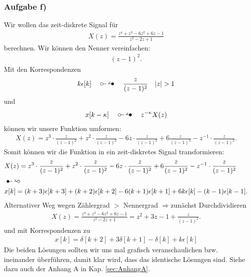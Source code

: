 \documentclass[11pt,a4paper,DIV=12]{scrartcl}
\begin{document}
\subsubsection{Aufgabe f)}
Wir wollen das zeit-diskrete Signal für
\begin{align}
	X(z)=\frac{z^4+z^3-6z^2+6z-1}{z^2-2z+1}
\end{align}
berechnen.
Wir können den Nenner vereinfachen:
\begin{align}
	(z-1)^2.
\end{align}
Mit den Korrespondenzen
\begin{align}
	k\epsilon[k]\quad\ztransf\quad\frac{z}{(z-1)^2}\quad |z|>1
\end{align}
und
\begin{align}
	x[k-\kappa]\quad\ztransf\quad z^{-\kappa}X(z)
\end{align}
können wir unsere Funktion umformen:
\begin{align}
	X(z)=z^3\cdot\frac{z}{(z-1)^2}+z^2\cdot\frac{z}{(z-1)^2}-6z\cdot\frac{z}{(z-1)^2}+6\frac{z}{(z-1)^2}-z^{-1}\cdot\frac{z}{(z-1)^2}.
\end{align}
Somit können wir die Funktion in ein zeit-diskretes Signal transformieren:
\begin{align}
	&X(z)=z^3\cdot\frac{z}{(z-1)^2}+z^2\cdot\frac{z}{(z-1)^2}-6z\cdot\frac{z}{(z-1)^2}+6\frac{z}{(z-1)^2}-z^{-1}\cdot\frac{z}{(z-1)^2} \nonumber\\
	&\Ztransf \nonumber\\
	&x[k]=(k+3)\epsilon[k+3]+(k+2)\epsilon[k+2]-6(k+1)\epsilon[k+1]+6k\epsilon[k]-(k-1)\epsilon[k-1].
\end{align}
%
%
Alternativer Weg wegen Zählergrad $>$ Nennergrad \quad $\Rightarrow$\quad zunächst
Durchdividieren
\begin{align}
X(z) = \frac{z^4 + z^3 -6z^2 + 6z -1}{z^2-2z+1} = z^2 + 3 z - 1 + \frac{z}{(z-1)^2}.
\end{align}%
und mit Korrespondenzen zu
\begin{align}
x[k] = \delta[k+2] +3 \delta[k+1] -\delta[k] +k\epsilon[k]
\end{align}
%
Die beiden Lösungen sollten wir uns mal grafisch veranschaulichen bzw. ineinander
überführen, damit klar wird, dass das identische Lösungen sind. Siehe dazu auch
der Anhang A in Kap. \ref{sec:AnhangA}.
\end{document}
